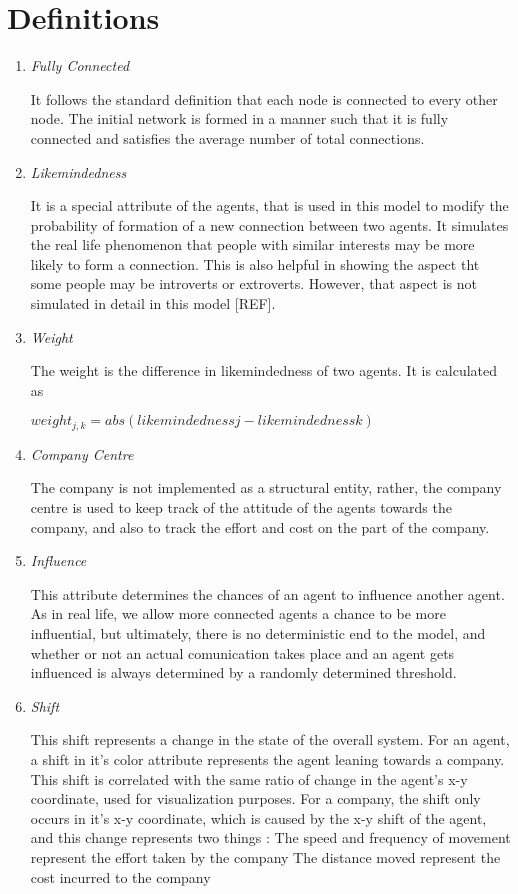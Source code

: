 \section{Definitions}
\begin{enumerate}
\item \emph{Fully Connected}

It follows the standard definition that each node is connected to every other node. The initial network is formed in a manner such that it is fully connected and satisfies the average number of total connections.

\item \emph{Likemindedness}

It is a special attribute of the agents, that is used in this model to modify the probability of formation of a new connection between two agents. It simulates the real life phenomenon that people with similar interests may be more likely to form a connection. This is also helpful in showing the aspect tht some people may be introverts or extroverts. However, that aspect is not simulated in detail in this model [REF].

\item \emph{Weight}

The weight is the difference in likemindedness of two agents. It is calculated as 

$weight_{j,k} = abs( likemindedness{j} - likemindedness{k} )$

\item \emph{Company Centre}

The company is not implemented as a structural entity, rather, the company centre is used to keep track of the attitude of the agents towards the company, and also to track the effort and cost on the part of the company.

\item \emph{Influence}

This attribute determines the chances of an agent to influence another agent. As in real life, we allow more connected agents a chance to be more influential, but ultimately, there is no deterministic end to the model, and whether or not an actual comunication takes place and an agent gets influenced is always determined by a randomly determined threshold.

\item \emph{Shift}

This shift represents a change in the state of the overall system. For an agent, a shift in it's color attribute represents the agent leaning towards a company. This shift is correlated with the same ratio of change in the agent's x-y coordinate, used for visualization purposes.
For a company, the shift only occurs in it's x-y coordinate, which is caused by the x-y shift of the agent, and this change represents two things : 
\subitem[A] The speed and frequency of movement represent the effort taken by the company
\subitem[B] The distance moved represent the cost incurred to the company
\end{enumerate}